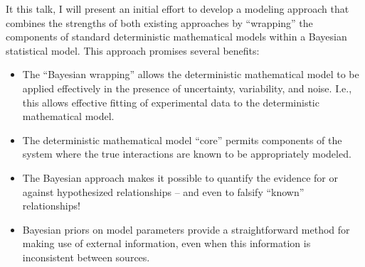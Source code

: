 \documentclass{article}
\begin{document}
  It this talk, I will present an initial effort to develop a modeling
  approach that combines the strengths of both existing approaches by
  ``wrapping'' the components of standard deterministic mathematical
  models within a Bayesian statistical model. This approach promises
  several benefits:
  \begin{itemize}
  \item The ``Bayesian wrapping'' allows the deterministic
    mathematical model to be applied effectively in the presence of
    uncertainty, variability, and noise. I.e., this allows effective
    fitting of experimental data to the deterministic mathematical
    model.
  \item The deterministic mathematical model ``core'' permits
    components of the system where the true interactions are known to
    be appropriately modeled.
  \item The Bayesian approach makes it possible to quantify the
    evidence for or against hypothesized relationships -- and even to
    falsify ``known'' relationships!
  \item Bayesian priors on model parameters provide a straightforward
    method for making use of external information, even when this
    information is inconsistent between sources.
  \end{itemize}
\end{document}

